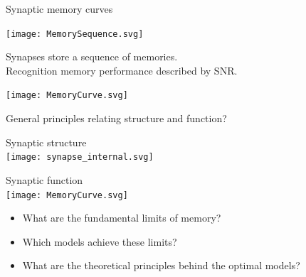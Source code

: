 \documentclass[final]{beamer}%
\begin{document}
\begin{frame}{Synaptic memory curves}
%
 \begin{center}
   \texttt{[image: MemorySequence.svg]}
 \end{center}
 Synapses store a sequence of memories.\\
 Recognition memory performance described by SNR.
 \begin{center}
   {\texttt{[image: MemoryCurve.svg]}}
 \end{center}
%
\end{frame}


\begin{frame}{General principles relating structure and function?}
%
 \vspace{-2\baselineskip}
 \begin{center}
 \parbox[t]{0.35\linewidth}{%
 \begin{center}
   Synaptic structure\\
   \texttt{[image: synapse\_internal.svg]}
 \end{center}
 }
 \hspace{0.1\linewidth}
 \parbox[t]{0.3\linewidth}{%
 \begin{center}
   Synaptic function\\
   \texttt{[image: MemoryCurve.svg]}
 \end{center}
 }
 \end{center}
 \begin{itemize}
   \item What are the fundamental limits of memory?
   \vp\item Which models achieve these limits?
   \vp\item What are the theoretical principles behind the optimal models?
 \end{itemize}
%
\end{frame}


\end{document}
